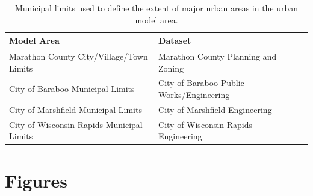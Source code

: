 \begin{table}
\begin{center}
	\caption{Municipal limits used to define the extent of major urban areas in the urban model area.}
	\begin{tabular}{l lc}
	\hline
		Model Area	      &	Dataset \\
	\hline	\hline
		Marathon County City/Village/Town Limits        &	Marathon County Planning and Zoning \\
		City of Baraboo Municipal Limits  &	City of Baraboo Public Works/Engineering	 	\\
		City of Marshfield Municipal Limits &	City of Marshfield Engineering \\
		City of Wisconsin Rapids Municipal Limits & City of Wisconsin Rapids Engineering\\
		\hline
	\end{tabular}
\label{tab:specific_urban_areas_limits}
\end{center}
\end{table}

\begin{landscape}
	
	
\end{landscape}
\section{Figures}


